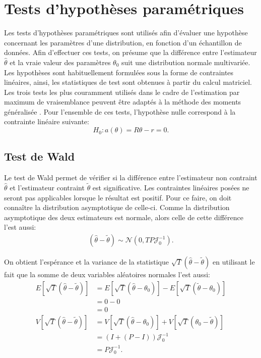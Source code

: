 \section{Tests d'hypothèses paramétriques}
\label{sec:testparam}

Les tests d'hypothèses paramétriques sont utilisés afin d'évaluer une
hypothèse concernant les paramètres d'une distribution, en fonction
d'un échantillon de données. Afin d'effectuer ces tests, on présume
que la différence entre l'estimateur $\hat\theta$ et la vraie valeur
des paramètres $\theta_0$ suit une distribution normale
multivariée. Les hypothèses sont habituellement formulées sous la
forme de contraintes linéaires, ainsi, les statistiques de test sont
obtenues à partir du calcul matriciel. Les trois tests les plus
couramment utilisés dans le cadre de l'estimation par maximum de
vraisemblance peuvent être adaptés à la méthode des moments
généralisée \citep{newey1994large}. Pour l'ensemble de ces tests,
l'hypothèse nulle correspond à la contrainte linéaire suivante:
\begin{equation}
  \label{eq:hypcontraintelin}
  H_0: a(\theta) = R\theta - r = 0.
\end{equation}

\subsection{Test de Wald}
\label{sec:testwald}

Le test de Wald permet de vérifier si la différence entre l'estimateur
non contraint $\hat\theta$ et l'estimateur contraint $\tilde\theta$
est significative. Les contraintes linéaires posées ne seront pas
applicables lorsque le résultat est positif. Pour ce faire, on doit
connaître la distribution asymptotique de celle-ci. Comme la
distribution asymptotique des deux estimateurs est normale, alors
celle de cette différence l'est aussi:
\begin{align}
  \label{eq:7}
  (\hat\theta - \tilde\theta) \sim \mathcal{N}(0,TP\mathcal{J}_0^{-1}).
\end{align}

On obtient l'espérance et la variance de la statistique
$\sqrt{T}\left(\hat\theta - \tilde\theta\right)$ en utilisant le fait
que la somme de deux variables aléatoires normales l'est aussi:
\begin{align}
  \label{eq:moyennevariancesomme}
  E\left[\sqrt{T}\left(\hat\theta - \tilde\theta\right) \right] &=
  E\left[\sqrt{T}\left(\hat\theta - \theta_0\right) \right] -
  E\left[\sqrt{T}\left(\tilde\theta - \theta_0\right) \right]\nonumber\\
  &= 0 - 0 \nonumber\\
  &= 0 \\
  V\left[\sqrt{T}\left(\hat\theta - \tilde\theta\right) \right] &=
  V\left[\sqrt{T}\left(\hat\theta - \theta_0\right) \right] +
  V\left[\sqrt{T}\left(\theta_0 - \tilde\theta\right) \right]\nonumber\\
  &= \left(I+(P-I)\right)\mathcal{J}_0^{-1}\nonumber\\
  &= P\mathcal{J}_0^{-1}.
\end{align}

